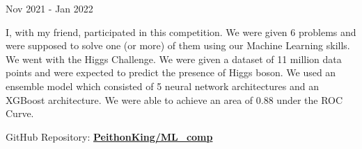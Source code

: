 	
	\hspace*{8.2mm}\faCalendar Nov 2021 - Jan 2022
	\vspace{-2mm}
	\begin{justify}
		I, with my friend, participated in this competition. We were given 6 problems and were supposed to solve one (or more) of them using our Machine Learning skills. We went with the Higgs Challenge. We were given a dataset of 11 million data points and were expected to predict the presence of Higgs boson. We used an ensemble model which consisted of 5 neural network architectures and an XGBoost architecture. We were able to achieve an area of 0.88 under the ROC Curve.

		\vspace{3mm}

		\noindent GitHub Repository: \href{https://github.com/PeithonKing/ML_comp}{\textbf{PeithonKing/ML\_comp}}
	\end{justify}